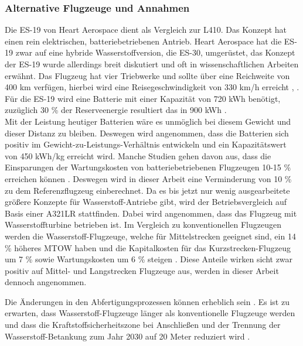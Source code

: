 \subsubsection{Alternative Flugzeuge und Annahmen}
Die ES-19 von Heart Aerospace dient als Vergleich zur L410. 
Das Konzept hat einen rein elektrischen, batteriebetriebenen Antrieb.
Heart Aerospace hat die ES-19 zwar auf eine hybride Wasserstoffversion, die ES-30, umgerüstet, 
das Konzept der ES-19 wurde allerdings breit diskutiert und oft in wissenschaftlichen Arbeiten erwähnt. 
Das Flugzeug hat vier Triebwerke und sollte über eine Reichweite von 400 km verfügen, 
hierbei wird eine Reisegeschwindigkeit von 330 km/h erreicht  \cite{anker2023feasibility}, \cite{heart_aerospace_es19}.
Für die ES-19 wird eine Batterie mit einer Kapazität von 720 kWh benötigt,
zuzüglich 30 \% der Reserveenergie resultiert das in 900 kWh \cite{donckers2024electric}. \\
Mit der Leistung heutiger Batterien wäre es unmöglich bei diesem Gewicht und dieser Distanz zu bleiben.
Deswegen wird angenommen, dass die Batterien sich positiv im Gewicht-zu-Leistungs-Verhältnis 
entwickeln und ein Kapazitätswert von 450 kWh/kg erreicht wird.
Manche Studien gehen davon aus, dass die Einsparungen der Wartungskosten 
von batteriebetriebenen Flugzeugen 10-15 \% erreichen können \cite{wangsness2021fremskyndet,avogadro2024demystifying}. 
Deswegen wird in dieser Arbeit eine Verminderung von 10 \% zu dem Referenzflugzeug einberechnet.
%
Da es bis jetzt nur wenig ausgearbeitete größere Konzepte für Wasserstoff-Antriebe gibt, 
wird der Betriebsvergleich auf Basis einer A321LR stattfinden. 
Dabei wird angenommen, dass das Flugzeug mit Wasserstoffturbine betrieben ist.
Im Vergleich zu konventionellen Flugzeugen werden die Wasserstoff-Flugzeuge, 
welche für Mittelstrecken geeignet sind, ein 14 \% höheres MTOW haben und die Kapitalkosten 
für das Kurzstrecken-Flugzeug um 7 \% sowie Wartungskosten um 6 \% steigen \cite{sky2020hydrogen}. 
Diese Anteile wirken sicht zwar positiv auf Mittel- und Langstrecken Flugzeuge aus, 
werden in dieser Arbeit dennoch angenommen.

Die Änderungen in den Abfertigungsprozessen können erheblich sein \cite{ati_hydrogen_infrastructure}. 
%
Es ist zu erwarten, dass Wasserstoff-Flugzeuge länger als konventionelle Flugzeuge werden
und dass die Kraftstoffsicherheitszone bei Anschließen und der Trennung 
der Wasserstoff-Betankung zum Jahr 2030 auf 20 Meter reduziert wird \cite{hoelzen2022h2}.

